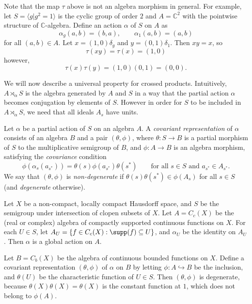 \begin{remark}
Note that the map $\tau$ above is not an algebra morphism in general. For example, let $S=\langle g|g^2=1\rangle$ is the cyclic group of order $2$ and $A=\mathbb{C}^2$ with the pointwise structure of $\mathbb{C}$-algebra. Define an action $\alpha$ of $S$ on $A$ as
\[\alpha_g(a,b)=(b,a),\qquad\alpha_1(a,b)=(a,b)\]
for all $(a,b)\in A$. Let $x=(1,0)\delta_g$ and $y=(0,1)\delta_1$. Then $xy=x$, so
\[\tau(xy)=\tau(x)=(1,0)\]
however,
\[\tau(x)\tau(y)=(1,0)(0,1)=(0,0).\]
\end{remark}

We will now describe a universal property for crossed products. Intuitively, $A\rtimes_\alpha S$ is the algebra generated by $A$ and $S$ in a way that the partial action $\alpha$ becomes conjugation by elements of $S$. However in order for $S$ to be included in $A\rtimes_\alpha S$, we need that all ideals $A_s$ have units.

\begin{definition}\label{definitioncovariantrepresentation}
Let $\alpha$ be a partial action of $S$ on an algebra $A$. A \emph{covariant representation} of $\alpha$ consists of an algebra $B$ and a pair $(\theta,\phi)$, where $\theta:S\to B$ is a partial morphism of $S$ to the multiplicative semigroup of $B$, and $\phi:A\to B$ is an algebra morphism, satisfying the \emph{covariance} condition
\[\phi(\alpha_s(a_{s^*}))=\theta(s)\phi(a_{s^*})\theta(s^*)\qquad\text{for all }s\in S\text{ and }a_{s^*}\in A_{s^*}.\]
We say that $(\theta,\phi)$ is \emph{non-degenerate} if $\theta(s)\theta(s^*)\in\phi(A_s)$ for all $s\in S$ (and \emph{degenerate} otherwise).
\end{definition}

\begin{example}
Let $X$ be a non-compact, locally compact Hausdorff space, and $S$ be the semigroup under intersection of clopen subsets of $X$. Let $A=C_c(X)$ be the (real or complex) algebra of compactly supported continuous functions on $X$. For each $U\in S$, let $A_U=\left\{f\in C_c(X):\supp(f)\subseteq U\right\}$, and $\alpha_U$ be the identity on $A_U$. Then $\alpha$ is a global action on $A$.

Let $B=C_b(X)$ be the algebra of continuous bounded functions on $X$. Define a covariant representation $(\theta,\phi)$ of $\alpha$ on $B$ by letting $\phi:A\hookrightarrow B$ be the inclusion, and $\theta(U)$ be the characteristic function of $U\in S$. Then $(\theta,\phi)$ is degenerate, because $\theta(X)\theta(X)=\theta(X)$ is the constant function at $1$, which does not belong to $\phi(A)$.
\end{example}

